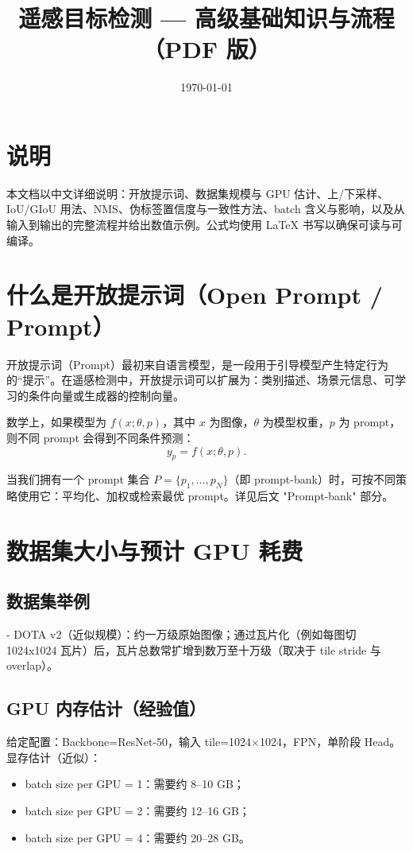\documentclass[11pt,a4paper]{article}
\title{遥感目标检测 — 高级基础知识与流程（PDF 版）}
\date{\today}
\begin{document}
\maketitle

\section*{说明}
本文档以中文详细说明：开放提示词、数据集规模与 GPU 估计、上/下采样、IoU/GIoU 用法、NMS、伪标签置信度与一致性方法、batch 含义与影响，以及从输入到输出的完整流程并给出数值示例。公式均使用 LaTeX 书写以确保可读与可编译。

\section{什么是开放提示词（Open Prompt / Prompt）}
开放提示词（Prompt）最初来自语言模型，是一段用于引导模型产生特定行为的“提示”。在遥感检测中，开放提示词可以扩展为：类别描述、场景元信息、可学习的条件向量或生成器的控制向量。

数学上，如果模型为 $f(x;\theta,p)$，其中 $x$ 为图像，$\theta$ 为模型权重，$p$ 为 prompt，则不同 prompt 会得到不同条件预测：
\[
y_p = f(x;\theta,p).
\]

当我们拥有一个 prompt 集合 $P=\{p_1,\dots,p_N\}$（即 prompt-bank）时，可按不同策略使用它：平均化、加权或检索最优 prompt。详见后文 "Prompt-bank" 部分。

\section{数据集大小与预计 GPU 耗费}
\subsection*{数据集举例}
- DOTA v2（近似规模）：约一万级原始图像；通过瓦片化（例如每图切 1024x1024 瓦片）后，瓦片总数常扩增到数万至十万级（取决于 tile stride 与 overlap）。

\subsection*{GPU 内存估计（经验值）}
给定配置：Backbone=ResNet-50，输入 tile=1024$\times$1024，FPN，单阶段 Head。显存估计（近似）：
\begin{itemize}
  \item batch size per GPU = 1：需要约 8--10 GB；
  \item batch size per GPU = 2：需要约 12--16 GB；
  \item batch size per GPU = 4：需要约 20--28 GB。
\end{itemize}
\end{document}

